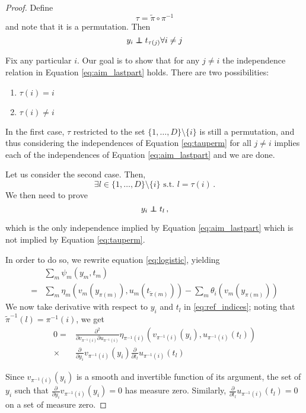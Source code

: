 \begin{proof}
Define
\[
\tau = \tilde{\pi} \circ \pi^{-1}
\]
and note that it is a permutation. Then
\begin{equation}
    y_i \independent t_{\tau(j)}  \forall i \neq j \label{eq:tauperm}
\end{equation}

Fix any particular $i$.
Our goal is to show that for any $j\not= i$ the independence relation in Equation \ref{eq:aim_lastpart} holds.
There are two possibilities:
\begin{enumerate}
\item $\tau(i)=i$
\item $\tau(i)\neq i$
\end{enumerate}
In the first case, $\tau$ restricted to the set $\{1,\ldots,D\}\setminus\{i\}$ is still a permutation, and thus considering the independences of Equation \ref{eq:tauperm} for all $j\not= i$ implies each of the independences of Equation \ref{eq:aim_lastpart} and we are done.

Let us consider the second case. Then,
\[
\exists l \in \{1, \ldots, D \}\setminus\{i\}\,\, \text{s.t.} \,\, l = \tau(i)\,.
\]
We then need to prove
\begin{equation}
y_i \independent t_l\,, \label{eq:ref_indices}
\end{equation}

which is the only independence implied by Equation \ref{eq:aim_lastpart} which is not implied by Equation \ref{eq:tauperm}.

In order to do so, we rewrite equation \ref{eq:logistic}, yielding
\begin{align}
&\sum_{m}\psi_{m}(y_{m},t_{m}) \nonumber \\
=&\sum_{m}\eta_{m}(v_m(y_{\pi(m)}), u_m(t_{\tilde{\pi}(m)}))
-\sum_{m}\theta_{i}(v_m(y_{\pi(m)}))
\end{align}
We now take derivative with respect to $y_i$ and $t_l$ in \ref{eq:ref_indices}; noting that $\tilde{\pi}^{-1}(l) = \pi^{-1}(i) $, we get
\begin{align}
    0 = & \frac{\partial^2}{\partial v_{\pi^{-1}(i)} \partial u_{\pi^{-1}(i)}} \eta_{\pi^{-1}(i)}(v_{\pi^{-1}(i)}(y_i), u_{\pi^{-1}(i)}(t_l)) \nonumber \\
    \times & \frac{\partial}{\partial y_i}v_{\pi^{-1}(i)}(y_i) \frac{\partial }{\partial t_l} u_{\pi^{-1}(i)}(t_l) \label{eq:perm_deriv}
\end{align}

Since $v_{\pi^{-1}(i)}(y_i)$ is a smooth and invertible function of its argument, the set of $y_i$ such that $\frac{\partial}{\partial y_i}v_{\pi^{-1}(i)}(y_i) = 0$ has measure zero.
Similarly, $\frac{\partial }{\partial t_l} u_{\pi^{-1}(i)}(t_l) = 0$ on a set of measure zero.


\end{proof}
